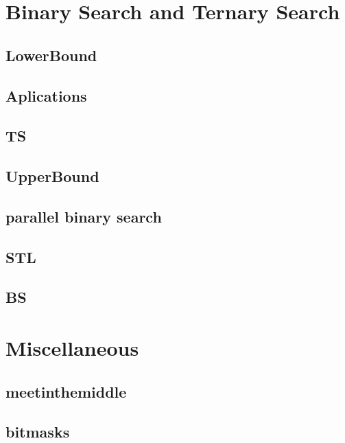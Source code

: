\section{Binary Search and Ternary Search}
\subsection{LowerBound}
\raggedbottom
\hrulefill
\subsection{Aplications}
\raggedbottom
\hrulefill
\subsection{TS}
\raggedbottom
\hrulefill
\subsection{UpperBound}
\raggedbottom
\hrulefill
\subsection{parallel binary search}
\raggedbottom
\hrulefill
\subsection{STL}
\raggedbottom
\hrulefill
\subsection{BS}
\raggedbottom
\hrulefill

\section{Miscellaneous}
\subsection{meetinthemiddle}
\raggedbottom
\hrulefill
\subsection{bitmasks}
\raggedbottom
\hrulefill
